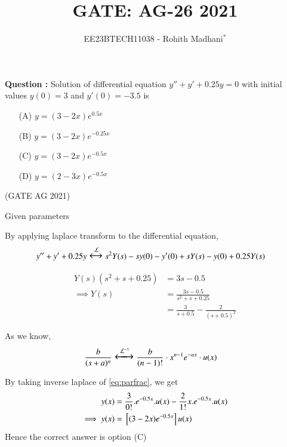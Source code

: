 \documentclass[journal,12pt,twocolumn]{IEEEtran}
\theoremstyle{remark}
\begin{document}

\vspace{3cm}

\title{GATE: AG-26 2021}
\author{EE23BTECH11038 - Rohith Madhani$^{*}$%
}
\maketitle
\newpage
\bigskip
\renewcommand{\thefigure}{\theenumi}
\renewcommand{\thetable}{\theenumi}

\textbf{Question :} Solution of differential equation $y'' + y'+ 0.25y = 0$ with initial values $y(0) = 3$ and $y'(0) = -3.5$ is
\begin{enumerate}
    \item[(A)] $ y = (3-2x)e^{0.5x} $
    \item[(B)] $ y = (3-2x)e^{-0.25x}$
    \item[(C)] $ y = (3-2x)e^{-0.5x}$
    \item[(D)] $ y = (2-3x)e^{-0.5x}$
\end{enumerate} 
\hfill(GATE AG 2021) \\
\solution

\begin{table}[!h] 
    \centering
    
    \caption{Given parameters}
    \label{table:gate21ag26}
\end{table}
By applying laplace transform to the differential equation,
\begin{align}
    y''+y'+0.25y &\Large\xleftrightarrow{\mathcal{L}} s^2Y(s)-sy(0)-y'(0)+sY(s)-y(0)+0.25Y(s)
\end{align}

\begin{align}
    Y(s)(s^2 + s + 0.25) &= 3s - 0.5 \\
    \implies Y(s) &= \frac{3s-0.5}{s^2 + s + 0.25} \\
    &= \frac{3}{s+0.5} - \frac{2}{(s+0.5)^2} \label{eq:parfrac}
\end{align}

As we know,
\begin{align}
    \frac{b}{(s+a)^n} &\Large\xleftrightarrow{\mathcal{L}^{-1}}\frac{b}{(n-1)!}\cdot x^{n-1} e^{-ax}\cdot u(x)
\end{align}

By taking inverse laplace of \eqref{eq:parfrac}, we get
\begin{align}
    y(x) &= \frac{3}{0!}.e^{-0.5x}.u(x)-\frac{2}{1!}x.e^{-0.5x}.u(x) \\
    \implies y(x) &= {}\left[(3-2x)e^{-0.5x}\right]u(x)
\end{align}
Hence the correct answer is option (C)
\end{document}
